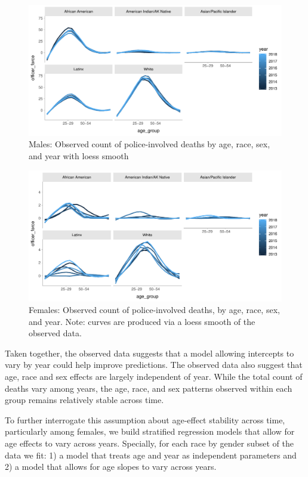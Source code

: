 \documentclass{article}
\begin{document}
\begin{figure}
\center
\includegraphics[width = \linewidth]{vis/fig_a2.pdf}
\caption{Males: Observed count of police-involved deaths by age, race, sex, and year with loess smooth}
\label{fig:a2}
\end{figure}

\begin{figure}
\center
\includegraphics[width = \linewidth]{vis/fig_a3.pdf}
\caption{Females: Observed count of police-involved deaths, by age, race, sex, and year. Note: curves are produced via a loess smooth of the observed data.}
\label{fig:a3}
\end{figure}

Taken together, the observed data suggests that a model allowing intercepts to vary by year could help improve predictions. The observed data also suggest that age, race and sex effects are largely independent of year. While the total count of deaths vary among years, the age, race, and sex patterns observed within each group remains relatively stable across time. 

To further interrogate this assumption about age-effect stability across time, particularly among females, we build stratified regression models that allow for age effects to vary across years. Specially, for each race by gender subset of the data we fit: 1) a model that treats age and year as independent parameters and 2) a model that allows for age slopes to vary across years. 
\end{document}
